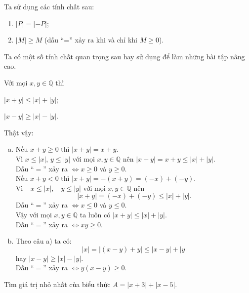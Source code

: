\begin{dang}
	Ta sử dụng các tính chất sau:
	\begin{enumerate}[\tickEX]
		\item $|P|=|-P|$;
		\item $|M|\geq M$ (dấu ``='' xảy ra khi và chỉ khi $M\geq0$).
	\end{enumerate}
\end{dang}
\begin{note}
	Ta có một số tính chất quan trọng sau hay sử dụng để làm những bài tập nâng cao.
	
	Với mọi $x,y\in\mathbb{Q}$ thì
	\begin{listEX}[2]
	\item $|x+y|\leq |x|+|y|$;
	\item $|x-y|\geq |x|-|y|$.
	\end{listEX}
Thật vậy:
\begin{enumerate}[a)]
	\item Nếu $x+y\geq0$ thì $|x+y|=x+y$.\\
	Vì $x\leq |x|$, $y\leq|y|$ với mọi $x,y\in\mathbb{Q}$ nên  $|x+y|=x+y\leq|x|+|y|$.\\
	Dấu ``$=$'' xảy ra $\Leftrightarrow x\geq 0$ và $y\geq0$.\\
	Nếu $x+y<0$ thì $|x+y|=-(x+y)=(-x)+(-y)$.\\
	Vì $-x\leq |x|$, $-y\leq |y|$ với mọi $x,y\in\mathbb{Q}$ nên
	\[
	|x+y|=(-x)+(-y)\leq |x|+|y|.
	\]
	Dấu ``$=$'' xảy ra $\Leftrightarrow x\leq 0$ và $y\leq 0$.\\
	Vậy với mọi $x,y\in\mathbb{Q}$ ta luôn có $|x+y|\leq |x|+|y|$.\\
	Dấu ``$=$'' xảy ra $\Leftrightarrow xy\geq 0$.
	\item Theo câu a) ta có: \[|x|=|(x-y)+y|\leq |x-y|+|y|\]
	hay $|x-y|\geq|x|-|y|$.\\
	Dấu ``$=$'' xảy ra $\Leftrightarrow y(x-y)\geq 0$.
\end{enumerate}



\end{note}
\begin{vd}
	Tìm giá trị nhỏ nhất của biểu thức $A=|x+3|+|x-5|$.
\end{vd}

